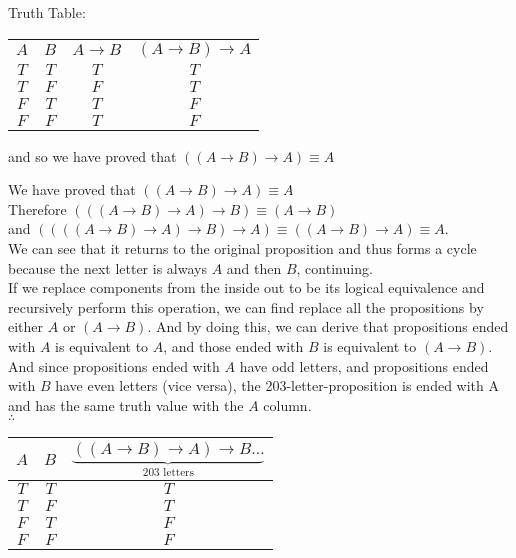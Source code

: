 \documentclass[12pt]{exam}
\begin{document}
\begin{solution}
\begin{qparts}
     \item 
     Truth Table:
     \begin{center}
            \begin{tabular}{c c | c | c}
            $A$ & $B$ & $A \rightarrow B$ & $(A \rightarrow B) \rightarrow A$ \\
            $T$ & $T$ & $T$ &  $T$\\
            $T$ & $F$ & $F$ & $T$\\
            $F$ & $T$ & $T$ &  $F$\\
            $F$ & $F$ & $T$ &  $F$\\
            \end{tabular}
    \end{center}
    and so we have proved that $((A \rightarrow B) \rightarrow A) \equiv A$
    \item
    We have proved that $((A \rightarrow B) \rightarrow A) \equiv A$ \\
    Therefore $(((A \rightarrow B) \rightarrow A) \rightarrow B) \equiv (A \rightarrow B) $\\ 
    and $((((A \rightarrow B) \rightarrow A) \rightarrow B) \rightarrow A) \equiv ((A \rightarrow B) \rightarrow A)  \equiv A $. \\We can see that it returns to the original proposition and thus forms a cycle because the next letter is always $A$ and then $B$, continuing. \\
    If we replace components from the inside out to be its logical equivalence and recursively perform this operation, we can find replace all the propositions by either $A$ or $(A \rightarrow B)$. And by doing this, we can derive that propositions ended with $A$ is equivalent to $A$, and those ended with $B$ is equivalent to $(A \rightarrow B)$. \\
    And since propositions ended with $A$ have odd letters, and propositions ended with $B$ have even letters (vice versa), the 203-letter-proposition is ended with A and has the same truth value with the $A$ column. \\
    $\therefore$
    \begin{center}
            \begin{tabular}{c c | c}
            $A$ & $B$ & $\underbrace{((A\to B) \to A) \to B \dots}_{203 \text{ letters}}$ \\
            \hline
            $T$ & $T$ & $T$ \\
            $T$ & $F$ & $T$\\
            $F$ & $T$ & $F$\\
            $F$ & $F$ & $F$\\
            \end{tabular}
    \end{center}


\end{qparts}
\end{solution}
\end{document}
